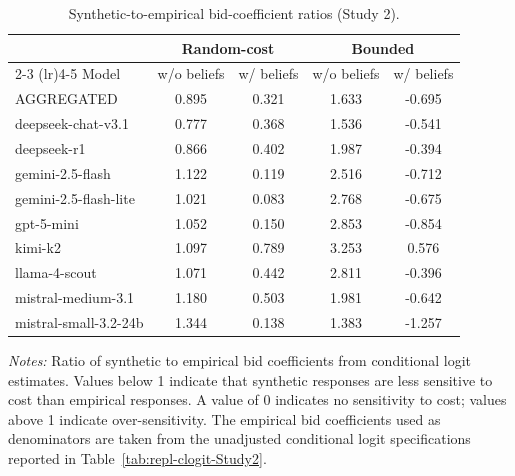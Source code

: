 \begin{table}[h]
\centering
\caption{Synthetic-to-empirical bid-coefficient ratios (Study 2).}
\label{tab:slope-ratios-Study2}
\begin{threeparttable}
\footnotesize
\begin{tabular}{lcccc}
\toprule
 & \multicolumn{2}{c}{Random-cost} & \multicolumn{2}{c}{Bounded} \\
\cmidrule(lr){2-3} \cmidrule(lr){4-5}
Model & w/o beliefs & w/ beliefs & w/o beliefs & w/ beliefs \\
\midrule
AGGREGATED &  0.895 &  0.321 &  1.633 & -0.695 \\
\midrule
deepseek-chat-v3.1 &  0.777 &  0.368 &  1.536 & -0.541 \\
deepseek-r1 &  0.866 &  0.402 &  1.987 & -0.394 \\
gemini-2.5-flash &  1.122 &  0.119 &  2.516 & -0.712 \\
gemini-2.5-flash-lite &  1.021 &  0.083 &  2.768 & -0.675 \\
gpt-5-mini &  1.052 &  0.150 &  2.853 & -0.854 \\
kimi-k2 &  1.097 &  0.789 &  3.253 &  0.576 \\
llama-4-scout &  1.071 &  0.442 &  2.811 & -0.396 \\
mistral-medium-3.1 &  1.180 &  0.503 &  1.981 & -0.642 \\
mistral-small-3.2-24b &  1.344 &  0.138 &  1.383 & -1.257 \\
\bottomrule
\end{tabular}
\begin{tablenotes}\footnotesize
\item \textit{Notes:} Ratio of synthetic to empirical bid coefficients from conditional logit estimates. 
Values below 1 indicate that synthetic responses are less sensitive to cost than empirical responses. 
A value of 0 indicates no sensitivity to cost; values above 1 indicate over-sensitivity. 
The empirical bid coefficients used as denominators are taken from the unadjusted conditional logit specifications reported in Table~\ref{tab:repl-clogit-Study2}.
\end{tablenotes}
\end{threeparttable}
\end{table}
